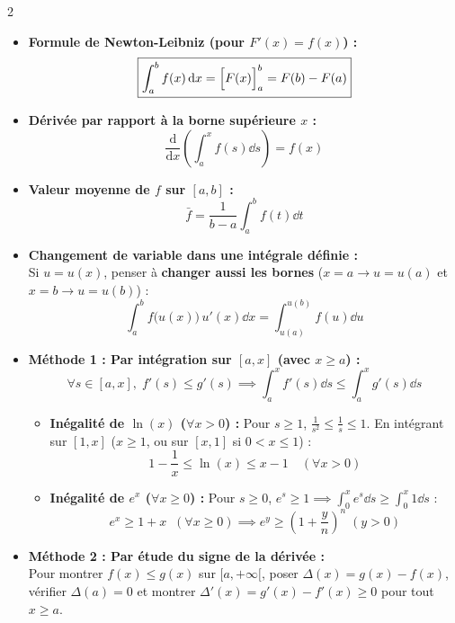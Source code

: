 {\fontsize{9.4pt}{11.4pt}\selectfont
\setlength{\columnsep}{18pt}
\begin{multicols}{2}

\begin{itemize}[leftmargin=1.2em, itemsep=2pt, topsep=2pt]
    \item \textbf{Formule de Newton-Leibniz (pour $F'(x) = f(x)$) :}
    \[
        \boxed{\int_a^b f(x)\,\mathrm{d} x = \Bigl[F(x)\Bigr]_a^b = F(b) - F(a)}
    \]
    \item \textbf{Dérivée par rapport à la borne supérieure $x$ :}
    \[
        \frac{\mathrm{d}}{\mathrm{d}x}\left(\int_a^x f(s)\dd s\right) = f(x)
    \]
    \item \textbf{Valeur moyenne de $f$ sur $[a, b]$ :}
    \[
        \bar{f} = \frac{1}{b - a}\int_a^b f(t)\dd t
    \]
    \item \textbf{Changement de variable dans une intégrale définie :}\\
    Si $u = u(x)$, penser à \textbf{changer aussi les bornes} ($x=a \to u=u(a)$ et $x=b \to u=u(b)$) :
    \[
        \int_a^b f\bigl(u(x)\bigr)\,u'(x)\dd x = \int_{u(a)}^{u(b)} f(u)\dd u
    \]
\end{itemize}

\vspace{4pt}
\begin{itemize}[leftmargin=1.2em, itemsep=2pt, topsep=2pt]
    \item \textbf{Méthode 1 : Par intégration sur $[a, x]$ (avec $x \ge a$) :}
    \[
        \forall s \in [a, x], \; f'(s) \le g'(s) \implies \int_a^x f'(s)\dd s \le \int_a^x g'(s)\dd s
    \]
    \begin{itemize}[leftmargin=1em, itemsep=1.5pt, topsep=1pt]
        \item \textbf{Inégalité de $\ln(x)$ ($\forall x > 0$) :} Pour $s \ge 1$, $\frac{1}{s^2} \le \frac{1}{s} \le 1$. En intégrant sur $[1, x]$ ($x \ge 1$, ou sur $[x, 1]$ si $0 < x \le 1$) :
        \[
            \boxed{1 - \frac{1}{x} \le \ln(x) \le x - 1 \quad (\forall x > 0)}
        \]
        \item \textbf{Inégalité de $e^x$ ($\forall x \ge 0$) :} Pour $s \ge 0$, $e^s \ge 1 \implies \int_0^x e^s\dd s \ge \int_0^x 1\dd s$ :
        \[
            \boxed{e^x \ge 1 + x \;\; (\forall x \ge 0)} \implies e^y \ge \left(1 + \frac{y}{n}\right)^n \; (y > 0)
        \]
    \end{itemize}
    \item \textbf{Méthode 2 : Par étude du signe de la dérivée :}\\
    Pour montrer $f(x) \le g(x)$ sur $[a, +\infty[$, poser $\Delta(x) = g(x) - f(x)$, vérifier $\Delta(a) = 0$ et montrer $\Delta'(x) = g'(x) - f'(x) \ge 0$ pour tout $x \ge a$.
\end{itemize}


\end{multicols}}
